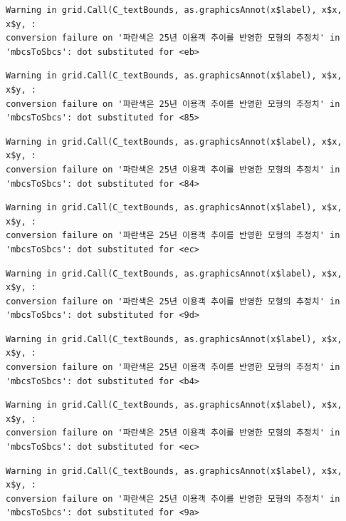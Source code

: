 \documentclass[
  letterpaper,
  DIV=11,
  numbers=noendperiod]{scrreprt}
\begin{document}
\begin{verbatim}
Warning in grid.Call(C_textBounds, as.graphicsAnnot(x$label), x$x, x$y, :
conversion failure on '파란색은 25년 이용객 추이를 반영한 모형의 추정치' in
'mbcsToSbcs': dot substituted for <eb>
\end{verbatim}

\begin{verbatim}
Warning in grid.Call(C_textBounds, as.graphicsAnnot(x$label), x$x, x$y, :
conversion failure on '파란색은 25년 이용객 추이를 반영한 모형의 추정치' in
'mbcsToSbcs': dot substituted for <85>
\end{verbatim}

\begin{verbatim}
Warning in grid.Call(C_textBounds, as.graphicsAnnot(x$label), x$x, x$y, :
conversion failure on '파란색은 25년 이용객 추이를 반영한 모형의 추정치' in
'mbcsToSbcs': dot substituted for <84>
\end{verbatim}

\begin{verbatim}
Warning in grid.Call(C_textBounds, as.graphicsAnnot(x$label), x$x, x$y, :
conversion failure on '파란색은 25년 이용객 추이를 반영한 모형의 추정치' in
'mbcsToSbcs': dot substituted for <ec>
\end{verbatim}

\begin{verbatim}
Warning in grid.Call(C_textBounds, as.graphicsAnnot(x$label), x$x, x$y, :
conversion failure on '파란색은 25년 이용객 추이를 반영한 모형의 추정치' in
'mbcsToSbcs': dot substituted for <9d>
\end{verbatim}

\begin{verbatim}
Warning in grid.Call(C_textBounds, as.graphicsAnnot(x$label), x$x, x$y, :
conversion failure on '파란색은 25년 이용객 추이를 반영한 모형의 추정치' in
'mbcsToSbcs': dot substituted for <b4>
\end{verbatim}

\begin{verbatim}
Warning in grid.Call(C_textBounds, as.graphicsAnnot(x$label), x$x, x$y, :
conversion failure on '파란색은 25년 이용객 추이를 반영한 모형의 추정치' in
'mbcsToSbcs': dot substituted for <ec>
\end{verbatim}

\begin{verbatim}
Warning in grid.Call(C_textBounds, as.graphicsAnnot(x$label), x$x, x$y, :
conversion failure on '파란색은 25년 이용객 추이를 반영한 모형의 추정치' in
'mbcsToSbcs': dot substituted for <9a>
\end{verbatim}
\end{document}
